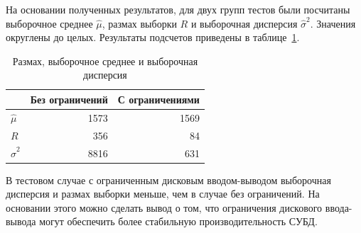 На основании полученных результатов, для двух групп тестов были посчитаны выборочное среднее $\hat{\mu}$, размах выборки $R$ и выборочная дисперсия $\hat{\sigma}^2$. Значения округлены до целых. Результаты подсчетов приведены в таблице~\ref{tab:vlasou}.

\begin{table}[H]
\caption{Размах, выборочное среднее и выборочная дисперсия}
\label{tab:vlasou}
\begin{center}
\begin{tabular}{|l|r|r|}
\hline
                 & \multicolumn{1}{c|}{\textbf{Без ограничений}} & \multicolumn{1}{c|}{\textbf{С ограничениями}} \\ \hline
$\hat{\mu}$      & 1573                                          & 1569                                          \\ \hline
$R$              & 356                                           & 84                                            \\ \hline
$\hat{\sigma}^2$ & 8816                                          & 631                                           \\ \hline
\end{tabular}
\end{center}
\end{table}

В тестовом случае с ограниченным дисковым вводом-выводом выборочная дисперсия и размах выборки меньше, чем в случае без ограничений. На основании этого можно сделать вывод о том, что ограничения дискового ввода-вывода могут обеспечить более стабильную производительность СУБД.
